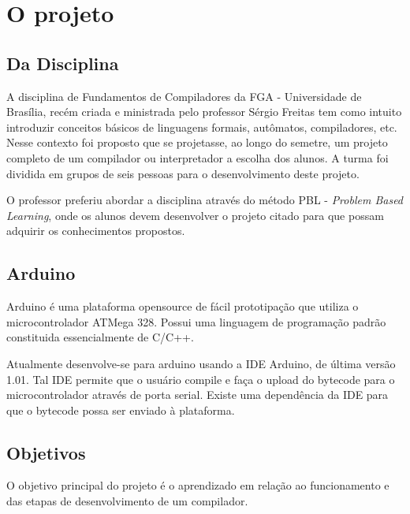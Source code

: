 \documentclass{abnt}
\begin{document}

\capa
\folhaderosto

\chapter{O projeto}
    \section{Da Disciplina}
    A disciplina de Fundamentos de Compiladores da FGA - Universidade de Brasília, recém criada e ministrada pelo professor Sérgio Freitas tem como intuito introduzir conceitos básicos de linguagens formais, autômatos, compiladores, etc. Nesse contexto foi proposto que se projetasse, ao longo do semetre, um projeto completo de um compilador ou interpretador a escolha dos alunos. A turma foi dividida em grupos de seis pessoas para o desenvolvimento deste projeto.

    O professor preferiu abordar a disciplina através do método PBL - \textit{Problem Based Learning}, onde os alunos devem desenvolver o projeto citado para que possam adquirir os conhecimentos propostos.

\section{Arduino}
Arduino é uma plataforma opensource de fácil prototipação que utiliza o microcontrolador ATMega 328. Possui uma linguagem de programação padrão constituida essencialmente de C/C++.

Atualmente desenvolve-se para arduino usando a IDE Arduino, de última versão 1.01. Tal IDE permite que o usuário compile e faça o upload do bytecode para o microcontrolador através de porta serial. Existe uma dependência da IDE para que o bytecode possa ser enviado à plataforma.

    \section{Objetivos}

    O objetivo principal do projeto é o aprendizado em relação ao funcionamento e das etapas de desenvolvimento de um compilador.
\end{document}
